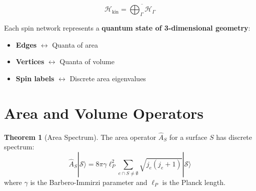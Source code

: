 \documentclass[11pt,a4paper,twoside]{book}
\theoremstyle{definition}
\newtheorem{theorem}{Theorem}[chapter]
\newcommand{\spinnetwork}{\mathcal{S}}
\newcommand{\hilbert}{\mathcal{H}}
\begin{document}
\begin{equation}
    \hilbert_{\text{kin}} = \overline{\bigoplus_{\Gamma} \hilbert_{\Gamma}}
\end{equation}

\begin{conceptbox}
Each spin network represents a \textbf{quantum state of 3-dimensional geometry}:
\begin{itemize}
    \item \textbf{Edges} $\leftrightarrow$ Quanta of area
    \item \textbf{Vertices} $\leftrightarrow$ Quanta of volume
    \item \textbf{Spin labels} $\leftrightarrow$ Discrete area eigenvalues
\end{itemize}
\end{conceptbox}

\section{Area and Volume Operators}

\begin{theorem}[Area Spectrum]
The area operator $\hat{A}_S$ for a surface $S$ has discrete spectrum:
\begin{equation}
    \hat{A}_S |\spinnetwork\rangle = 8\pi \gamma \ell_P^2 
    \sum_{e \cap S \neq \emptyset} \sqrt{j_e(j_e+1)} |\spinnetwork\rangle
\end{equation}
where $\gamma$ is the Barbero-Immirzi parameter and $\ell_P$ is the Planck length.
\end{theorem}
\end{document}
